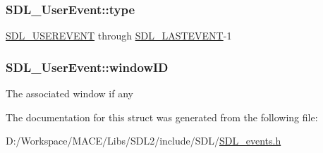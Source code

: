 \subsubsection[{\texorpdfstring{type}{type}}]{ S\+D\+L\+\_\+\+User\+Event\+::type}\hypertarget{struct_s_d_l___user_event_ab7afa8b98dbd7b52bef41155e10f7340}{}\label{struct_s_d_l___user_event_ab7afa8b98dbd7b52bef41155e10f7340}
\hyperlink{_s_d_l__events_8h_a3b589e89be6b35c02e0dd34a55f3fccaa4364c23f54802309e83fdb9b1c07c719}{S\+D\+L\+\_\+\+U\+S\+E\+R\+E\+V\+E\+NT} through \hyperlink{_s_d_l__events_8h_a3b589e89be6b35c02e0dd34a55f3fccaaffeac40a4ff366717c0ebc74118ea2ae}{S\+D\+L\+\_\+\+L\+A\+S\+T\+E\+V\+E\+NT}-\/1 
\subsubsection[{\texorpdfstring{window\+ID}{windowID}}]{ S\+D\+L\+\_\+\+User\+Event\+::window\+ID}\hypertarget{struct_s_d_l___user_event_abccefa10e0e0e3a0801bc6d836a08da7}{}\label{struct_s_d_l___user_event_abccefa10e0e0e3a0801bc6d836a08da7}
The associated window if any 

The documentation for this struct was generated from the following file\+:\begin{DoxyCompactItemize}
\item 
D\+:/\+Workspace/\+M\+A\+C\+E/\+Libs/\+S\+D\+L2/include/\+S\+D\+L/\hyperlink{_s_d_l__events_8h}{S\+D\+L\+\_\+events.\+h}\end{DoxyCompactItemize}
